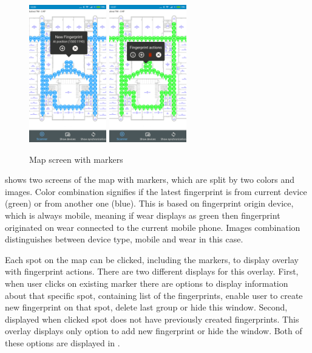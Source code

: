 \begin{figure}[h!]
	\begin{centering}
		\includegraphics[width=0.30\textwidth]{img/map_markers}
		\hspace{0.2cm}
		\includegraphics[width=0.30\textwidth]{img/map_markers_own}
		\par\end{centering}
	\caption{Map screen with markers\label{fig:map_with_markers}}
	\label{fig04c05}
\end{figure}

 shows two screens of the map with markers, which are split by two colors and images. Color combination signifies if the latest fingerprint is from current device (green) or from another one (blue). This is based on fingerprint origin device, which is always mobile, meaning if wear displays as green then fingerprint originated on wear connected to the current mobile phone. Images combination distinguishes between device type, mobile and wear in this case.

Each spot on the map can be clicked, including the markers, to display overlay with fingerprint actions. There are two different displays for this overlay. First, when user clicks on existing marker there are options to display information about that specific spot, containing list of the fingerprints, enable user to create new fingerprint on that spot, delete last group or hide this window. Second, displayed when clicked spot does not have previously created fingerprints. This overlay displays only option to add new fingerprint or hide the window. Both of these options are displayed in .


